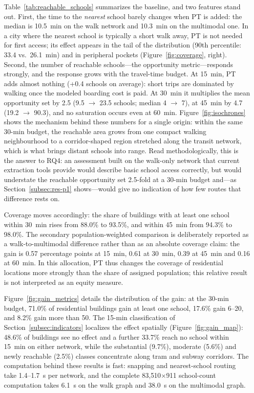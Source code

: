 \documentclass[smartcities,article,submit,moreauthors]{Definitions/mdpi}
\begin{document}
    Table~\ref{tab:reachable_schools} summarizes the baseline, and two features stand out.
    First, the time to the \emph{nearest} school barely changes when PT is added: the median is
    10.5~min on the walk network and 10.3~min on the multimodal one.
    In a city where the nearest school is typically a short walk away, PT is not needed for first
    access; its effect appears in the tail of the distribution (90th percentile: 33.4 vs.\ 26.1~min)
    and in peripheral pockets (Figure~\ref{fig:coverage}, right).
    Second, the number of reachable schools---the opportunity metric---responds strongly, and the
    response grows with the travel-time budget.
    At 15~min, PT adds almost nothing (+0.4 schools on average): short trips are dominated by walking
    once the modeled boarding cost is paid.
    At 30~min it multiplies the mean opportunity set by 2.5 (9.5 $\to$ 23.5 schools; median 4 $\to$ 7),
    at 45~min by 4.7 (19.2 $\to$ 90.3), and no saturation occurs even at 60~min.
    Figure~\ref{fig:isochrones} shows the mechanism behind these numbers for a single origin: within
    the same 30-min budget, the reachable area grows from one compact walking neighbourhood to a
    corridor-shaped region stretched along the transit network, which is what brings distant schools
    into range.
    Read methodologically, this is the answer to RQ4: an assessment built on the walk-only network that
    current extraction tools provide would describe basic school access correctly, but would understate
    the reachable opportunity set 2.5-fold at a 30-min budget and---as
    Section~\ref{subsec:res-p1} shows---would give no indication of how few routes that difference
    rests on.

    Coverage moves accordingly: the share of buildings with at least one school within 30~min rises
    from 88.0\% to 93.5\%, and within 45~min from 94.3\% to 98.0\%.
    The secondary population-weighted comparison is deliberately reported as a walk-to-multimodal
    difference rather than as an absolute coverage claim: the gain is 0.57 percentage points at
    15~min, 0.61 at 30~min, 0.39 at 45~min and 0.16 at 60~min.
    In this allocation, PT thus changes the coverage of residential locations more strongly than the
    share of assigned population; this relative result is not interpreted as an equity measure.

    Figure~\ref{fig:gain_metrics} details the distribution of the gain: at the 30-min budget, 71.0\%
    of residential buildings gain at least one school, 17.6\% gain 6--20, and 8.2\% gain more than 50.
    The 15-min classification of Section~\ref{subsec:indicators} localizes the effect spatially
    (Figure~\ref{fig:gain_map}): 48.6\% of buildings see no effect and a further 33.7\% reach no
    school within 15~min on either network, while the substantial (9.7\%), moderate (5.6\%) and newly
    reachable (2.5\%) classes concentrate along tram and subway corridors.
    The computation behind these results is fast: snapping and nearest-school routing take
    1.4--1.7~s per network, and the complete 83{,}510$\times$911 school-count computation takes 6.1~s
    on the walk graph and 38.0~s on the multimodal graph.
\end{document}
